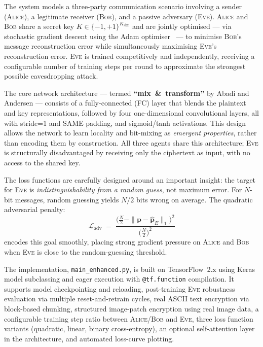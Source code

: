 \documentclass[12pt, a4paper]{article}
\newcommand{\alice}{\textsc{Alice}}
\newcommand{\bob}{\textsc{Bob}}
\newcommand{\eve}{\textsc{Eve}}
\newcommand{\code}[1]{\texttt{\color{CodeRed}#1}}
\newcommand{\N}{N}                 %
\begin{document}
\vspace{0.4cm}

The system models a three-party communication scenario involving a sender
(\alice{}), a legitimate receiver (\bob{}), and a passive adversary (\eve{}).
\alice{} and \bob{} share a secret key $K \in \{-1,+1\}^{K_{\text{size}}}$
and are jointly optimised — via stochastic gradient descent using the Adam
optimiser~\cite{kingma2014adam} — to minimise \bob{}'s message reconstruction
error while simultaneously maximising \eve{}'s reconstruction error.
\eve{} is trained competitively and independently, receiving a configurable
number of training steps per round to approximate the strongest possible
eavesdropping attack.

The core network architecture — termed \textbf{``mix~\&~transform''} by
Abadi and Andersen — consists of a fully-connected (FC) layer that blends
the plaintext and key representations, followed by four one-dimensional
convolutional layers, all with stride=1 and SAME padding, and sigmoid/tanh
activations. This design allows the network to learn locality and bit-mixing
as \emph{emergent properties}, rather than encoding them by construction.
All three agents share this architecture; \eve{} is structurally
disadvantaged by receiving only the ciphertext as input, with no access
to the shared key.

The loss functions are carefully designed around an important insight: the
target for \eve{} is \emph{indistinguishability from a random guess}, not
maximum error. For $\N$-bit messages, random guessing yields $\N/2$ bits
wrong on average. The quadratic adversarial penalty:
%
\begin{equation}
  \mathcal{L}_{\text{adv}}
  \;=\;
  \frac{\bigl(\tfrac{N}{2} - \|\mathbf{p} - \hat{\mathbf{p}}_E\|_1\bigr)^2}
       {\bigl(\tfrac{N}{2}\bigr)^2}
  \label{eq:adv_loss_abstract}
\end{equation}
%
encodes this goal smoothly, placing strong gradient pressure on \alice{}
and \bob{} when \eve{} is close to the random-guessing threshold.

The implementation, \code{main\_enhanced.py}, is built on
TensorFlow~2.x using Keras model subclassing and eager execution with
\code{@tf.function} compilation. It supports model checkpointing and
reloading, post-training \eve{} robustness evaluation via multiple
reset-and-retrain cycles, real ASCII text encryption
via block-based chunking, structured image-patch encryption using
real image data, a configurable training step ratio between
\alice/\bob{} and \eve{}, three loss function variants (quadratic,
linear, binary cross-entropy), an optional self-attention layer in the
architecture, and automated loss-curve plotting.
\end{document}
